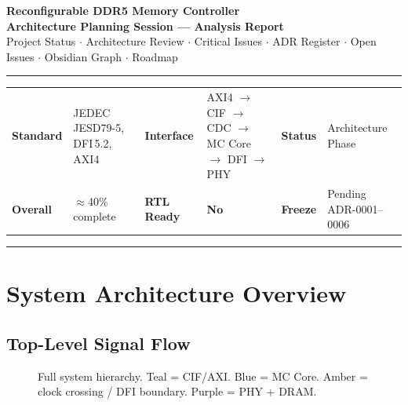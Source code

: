 \documentclass[10pt,a4paper]{article}
\begin{document}

\begin{flushleft}
  {\large\bfseries\color{acc1} Reconfigurable DDR5 Memory Controller}\\[2pt]
  {\normalsize\bfseries Architecture Planning Session --- Analysis Report}\\[3pt]
  {\small\color{notetext}
   Project Status $\cdot$ Architecture Review $\cdot$ Critical Issues $\cdot$
   ADR Register $\cdot$ Open Issues $\cdot$ Obsidian Graph $\cdot$ Roadmap}
\end{flushleft}
\noindent\color{acc1}\rule{\linewidth}{0.7pt}
\smallskip
\begin{tabular}{@{}ll@{\quad}ll@{\quad}ll@{}}
\small\textbf{Standard}   & \small JEDEC JESD79-5, DFI\,5.2, AXI4 &
\small\textbf{Interface}  & \small AXI4 $\to$ CIF $\to$ CDC $\to$ MC Core $\to$ DFI $\to$ PHY &
\small\textbf{Status}     & \small Architecture Phase \\
\small\textbf{Overall}    & \small $\approx$40\% complete &
\small\textbf{RTL Ready}  & \small \textcolor{acc2}{\textbf{No}} &
\small\textbf{Freeze}     & \small Pending ADR-0001--0006 \\
\end{tabular}
\vspace{2pt}\noindent\color{ruleclr}\rule{\linewidth}{0.4pt}

\section{System Architecture Overview}

\subsection{Top-Level Signal Flow}

\begin{figure}[h]
\centering
{}
\caption{Full system hierarchy. Teal = CIF/AXI. Blue = MC Core. Amber = clock crossing
         / DFI boundary. Purple = PHY + DRAM.}
\end{figure}
\end{document}
